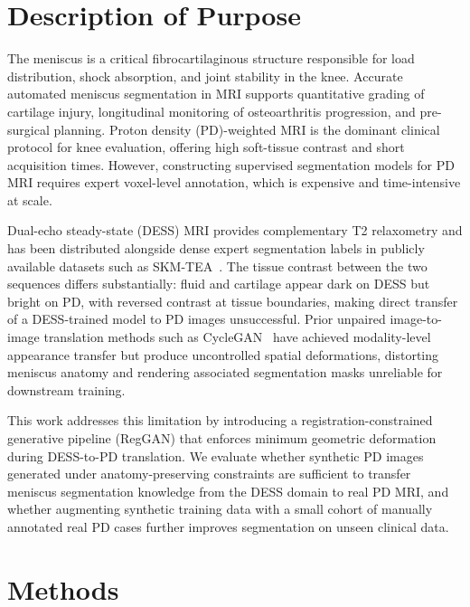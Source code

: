 \documentclass[12pt, a4paper]{article}
\begin{document}
\section{Description of Purpose}

The meniscus is a critical fibrocartilaginous structure responsible for load distribution, shock absorption, and joint stability in the knee. Accurate automated meniscus segmentation in MRI supports quantitative grading of cartilage injury, longitudinal monitoring of osteoarthritis progression, and pre-surgical planning. Proton density (PD)-weighted MRI is the dominant clinical protocol for knee evaluation, offering high soft-tissue contrast and short acquisition times. However, constructing supervised segmentation models for PD MRI requires expert voxel-level annotation, which is expensive and time-intensive at scale.

Dual-echo steady-state (DESS) MRI provides complementary T2 relaxometry and has been distributed alongside dense expert segmentation labels in publicly available datasets such as SKM-TEA~\cite{desai2022skmtea}. The tissue contrast between the two sequences differs substantially: fluid and cartilage appear dark on DESS but bright on PD, with reversed contrast at tissue boundaries, making direct transfer of a DESS-trained model to PD images unsuccessful. Prior unpaired image-to-image translation methods such as CycleGAN~\cite{zhu2017cyclegan} have achieved modality-level appearance transfer but produce uncontrolled spatial deformations, distorting meniscus anatomy and rendering associated segmentation masks unreliable for downstream training.

This work addresses this limitation by introducing a registration-constrained generative pipeline (RegGAN) that enforces minimum geometric deformation during DESS-to-PD translation. We evaluate whether synthetic PD images generated under anatomy-preserving constraints are sufficient to transfer meniscus segmentation knowledge from the DESS domain to real PD MRI, and whether augmenting synthetic training data with a small cohort of manually annotated real PD cases further improves segmentation on unseen clinical data.

\section{Methods}
\end{document}
